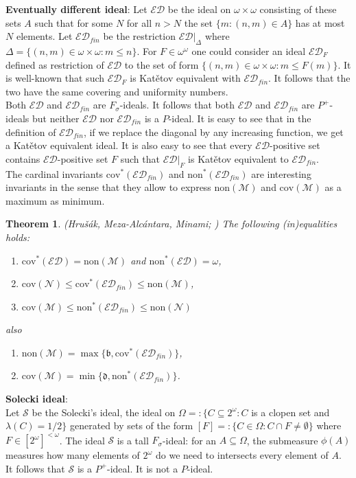 \documentclass[a4paper]{amsart}
\newtheorem{theorem}{Theorem}[section]
\newcommand{\bbb}{\mathfrak{b}}
\newcommand{\ddd}{\mathfrak{d}}
\newcommand{\Meager}{\mathcal{M}}
\newcommand{\Null}{\mathcal{N}}
\newcommand{\Baire}{\omega^{\omega}}
\newcommand{\Cantor}{2^{\omega}}
\newcommand{\cov}{\mathrm{cov}}
\newcommand{\non}{\mathrm{non}}
\newcommand{\Solecki}{\mathcal{S}}
\newcommand{\ED}{\mathcal{ED}}
\begin{document}
\textbf{Eventually different ideal}:
        Let $\ED$ be the ideal on $\omega\times\omega$ consisting of these sets $A$ such that for some $N$ for all $n>N$ the set $\{m: (n,m)\in A\}$ has at most $N$ elements. Let $\ED_{fin}$ be the restriction $\ED|_{\Delta}$ where $\Delta=\{(n,m)\in\omega\times\omega:m\leq n\}$. For $F\in\Baire$ one could consider an ideal $\ED_{F}$ defined as restriction of $\ED$ to the set of form $\{(n,m)\in\omega\times\omega:m\leq F(m)\}$. It is well-known that such $\ED_{F}$ is Katětov equivalent with $\ED_{fin}$. It follows that the two have the same covering and uniformity numbers.\\
        Both $\ED$ and $\ED_{fin}$ are $F_{\sigma}$-ideals. It follows that both $\ED$ and $\ED_{fin}$ are $P^+$-ideals but neither $\ED$ nor $\ED_{fin}$ is a $P$-ideal. It is easy to see that in the definition of $\ED_{fin}$, if we replace the diagonal by any increasing function, we get a Katětov equivalent ideal. It is also easy to see that every $\ED$-positive set contains $\ED$-positive set $F$ such that $\ED|_{F}$ is Katětov equivalent to $\ED_{fin}$.\\
        The cardinal invariants $\cov^{*}(\ED_{fin})$ and $\non^{*}(\ED_{fin})$ are interesting invariants in the sense that they allow to express $\non(\Meager)$ and $\cov(\Meager)$ as a maximum as minimum.
    \begin{theorem}(Hrušák, Meza-Alcántara, Minami; \cite{HrusakMeza})
        The following (in)equalities holds:
        \begin{enumerate}
            \item[--] $\cov^{*}(\ED)=\non(\Meager)$ and $\non^{*}(\ED)=\omega$,
            \item[--] $\cov(\Null)\leq\cov^{*}(\ED_{fin})\leq\non(\Meager)$,
            \item[--] $\cov(\Meager)\leq\non^{*}(\ED_{fin})\leq\non(\Null)$
        \end{enumerate}
        also
        \begin{enumerate}
            \item[--] $\non(\Meager)=\max\{\bbb,\cov^{*}(\ED_{fin})\}$,
            \item[--] $\cov(\Meager)=\min\{\ddd,\non^{*}(\ED_{fin})\}$.
        \end{enumerate}
    \end{theorem}
\textbf{Solecki ideal}:\\
        Let $\Solecki$ be the Solecki's ideal, the ideal on $\Omega=:\{C\subseteq\Cantor:C$ is a clopen set and $\lambda(C)=1/2\}$ generated by sets of the form $[F]=:\{C\in\Omega: C\cap F\neq\emptyset\}$ where $F\in[2^{\omega}]^{<\omega}$. The ideal $\Solecki$ is a tall $F_{\sigma}$-ideal: for an $A\subseteq\Omega$, the submeasure $\phi(A)$ measures how many elements of $\Cantor$ do we need to intersects every element of $A$. It follows that $\Solecki$ is a $P^{+}$-ideal. It is not a $P$-ideal.\\
        
\end{document}
